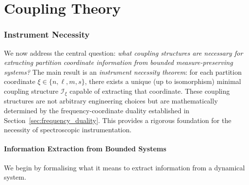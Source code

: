 \documentclass[twocolumn,10pt,a4paper]{article}
\theoremstyle{remark}
\begin{document}

\part{Coupling Theory}
\label{part:coupling}

\section{Instrument Necessity}
\label{sec:instrument_necessity}

We now address the central question: \emph{what coupling structures are necessary for extracting partition coordinate information from bounded measure-preserving systems?} The main result is an \emph{instrument necessity theorem}: for each partition coordinate $\xi \in \{n, \ell, m, s\}$, there exists a unique (up to isomorphism) minimal coupling structure $\mathcal{I}_\xi$ capable of extracting that coordinate. These coupling structures are not arbitrary engineering choices but are mathematically determined by the frequency-coordinate duality established in Section~\ref{sec:frequency_duality}. This provides a rigorous foundation for the necessity of spectroscopic instrumentation.

\subsection{Information Extraction from Bounded Systems}

We begin by formalising what it means to extract information from a dynamical system.
\end{document}
